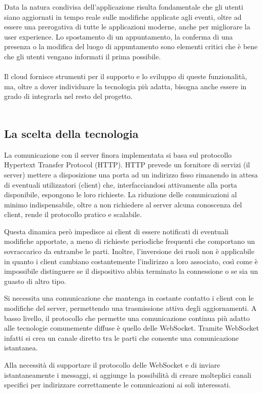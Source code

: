 Data la natura condivisa dell’applicazione risulta fondamentale che gli utenti siano aggiornati in tempo reale sulle modifiche applicate agli eventi, 
oltre ad essere una prerogativa di tutte le applicazioni moderne, anche per migliorare la user experience. 
Lo spostamento di un appuntamento, la conferma di una presenza o la modifica del luogo di appuntamento sono elementi critici che è bene che gli utenti vengano informati il prima possibile. \\
\\
Il cloud fornisce strumenti per il supporto e lo sviluppo di queste funzionalità, ma, oltre a dover individuare la tecnologia più adatta, bisogna anche essere in grado di integrarla nel resto del progetto.\\
\\
\subsection{La scelta della tecnologia}


La comunicazione con il server finora implementata si basa sul protocollo Hypertext Transfer Protocol (HTTP). HTTP prevede un fornitore di servizi (il server) mettere a disposizione una porta ad un indirizzo fisso rimanendo in attesa di eventuali utilizzatori (client) che, interfacciandosi attivamente alla porta disponibile,  espongono le loro richieste.
La riduzione delle comunicazioni al minimo indispensabile, oltre a non richiedere al server alcuna conoscenza del client, rende il protocollo pratico e scalabile.

Questa dinamica però impedisce ai client di essere notificati di eventuali modifiche apportate, a meno di richieste periodiche frequenti che comportano un sovraccarico da entrambe le parti. Inoltre, l’inversione dei ruoli non è applicabile in quanto i client cambiano costantemente l’indirizzo a loro associato, così come è impossibile distinguere se il dispositivo abbia terminato la connessione o se sia un guasto di altro tipo. 

Si necessita una comunicazione che mantenga in costante contatto i client con le modifiche del server, permettendo una trasmissione attiva degli aggiornamenti.
A basso livello, il protocollo che permette una comunicazione continua più adatto alle tecnologie comunemente diffuse è quello delle WebSocket. Tramite WebSocket infatti si crea un canale diretto tra le parti che consente una comunicazione istantanea. 

Alla necessità di supportare il protocollo delle WebSocket e di inviare istantaneamente i messaggi, si aggiunge la possibilità di creare molteplici canali specifici per indirizzare correttamente le comunicazioni ai soli interessati.


